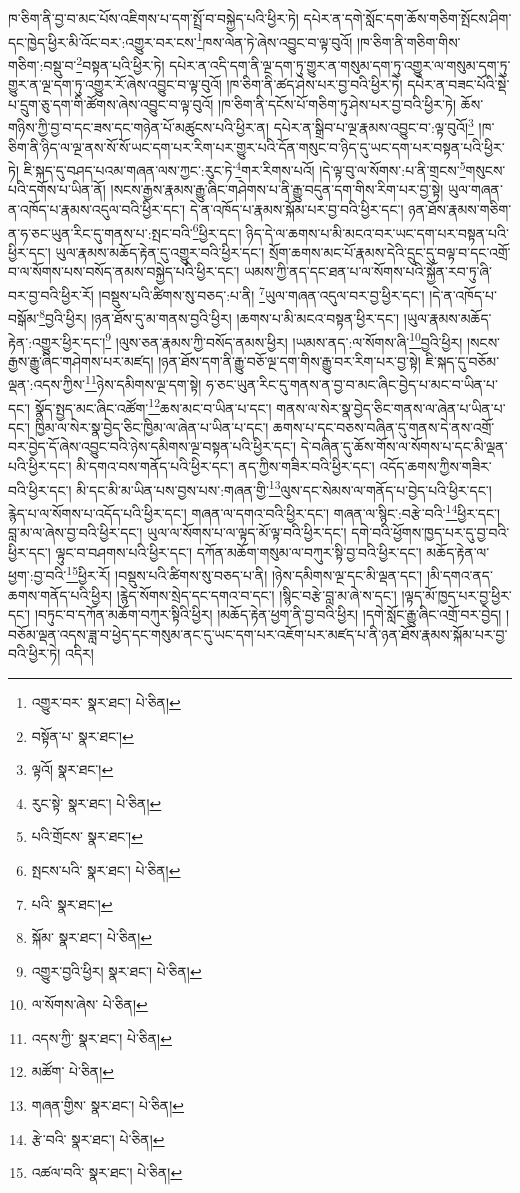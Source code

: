 ཁ་ཅིག་ནི་བྱ་བ་མང་པོས་འཇིགས་པ་དག་སྤྲོ་བ་བསྐྱེད་པའི་ཕྱིར་ཏེ། དཔེར་ན་དགེ་སློང་དག་ཆོས་གཅིག་སྤོངས་ཤིག་དང་ཁྱེད་ཕྱིར་མི་འོང་བར་:འགྱུར་བར་ངས་\footnote{འགྱུར་བར་  སྣར་ཐང་།  པེ་ཅིན། }ཁས་ལེན་ཏེ་ཞེས་འབྱུང་བ་ལྟ་བུའོ། །ཁ་ཅིག་ནི་གཅིག་གིས་གཅིག་:བསྡུ་བ་\footnote{བསྟོན་པ་  སྣར་ཐང་། }བསྟན་པའི་ཕྱིར་ཏེ། དཔེར་ན་འདི་དག་ནི་ལྔ་དག་ཏུ་གྱུར་ན་གསུམ་དག་ཏུ་འགྱུར་ལ་གསུམ་དག་ཏུ་གྱུར་ན་ལྔ་དག་ཏུ་འགྱུར་རོ་ཞེས་འབྱུང་བ་ལྟ་བུའོ། །ཁ་ཅིག་ནི་ཚད་ཤེས་པར་བྱ་བའི་ཕྱིར་ཏེ། དཔེར་ན་བཟང་པོའི་སྡེ་པ་དྲུག་ཅུ་དག་གི་ཚོགས་ཞེས་འབྱུང་བ་ལྟ་བུའོ། །ཁ་ཅིག་ནི་དངོས་པོ་གཅིག་ཏུ་ཤེས་པར་བྱ་བའི་ཕྱིར་ཏེ། ཆོས་གཉིས་ཀྱི་བྱ་བ་དང་ཟས་དང་གཉེན་པོ་མཚུངས་པའི་ཕྱིར་ན། དཔེར་ན་སྒྲིབ་པ་ལྔ་རྣམས་འབྱུང་བ་:ལྟ་བུའོ།\footnote{ལྟའོ།  སྣར་ཐང་། } །ཁ་ཅིག་ནི་ཉིད་ལ་ལྔ་ནས་སོ་སོ་ཡང་དག་པར་རིག་པར་གྱུར་པའི་དོན་གསུང་བ་ཉིད་དུ་ཡང་དག་པར་བསྟན་པའི་ཕྱིར་ཏེ། ཇི་སྐད་དུ་བཤད་པའམ་གཞན་ལས་ཀྱང་:རུང་ཏེ་\footnote{རུང་སྟེ་  སྣར་ཐང་།  པེ་ཅིན། }གར་རིགས་པའོ། །དེ་ལྟ་བུ་ལ་སོགས་:པ་ནི་གྲངས་\footnote{པའི་གྲོངས་  སྣར་ཐང་། }གསུངས་པའི་དགོས་པ་ཡིན་ནོ། །སངས་རྒྱས་རྣམས་རྒྱུ་ཞིང་གཤེགས་པ་ནི་རྒྱུ་བདུན་དག་གིས་རིག་པར་བྱ་སྟེ། ཡུལ་གཞན་ན་འཁོད་པ་རྣམས་འདུལ་བའི་ཕྱིར་དང་། དེ་ན་འཁོད་པ་རྣམས་སྐོམ་པར་བྱ་བའི་ཕྱིར་དང་། ཉན་ཐོས་རྣམས་གཅིག་ན་ཧ་ཅང་ཡུན་རིང་དུ་གནས་པ་:སྤང་བའི་\footnote{སྤངས་པའི་  སྣར་ཐང་།  པེ་ཅིན། }ཕྱིར་དང་། ཉིད་དེ་ལ་ཆགས་པ་མི་མངའ་བར་ཡང་དག་པར་བསྟན་པའི་ཕྱིར་དང་། ཡུལ་རྣམས་མཆོད་རྟེན་དུ་འགྱུར་བའི་ཕྱིར་དང་། སྲོག་ཆགས་མང་པོ་རྣམས་དེའི་དྲུང་དུ་བལྟ་བ་དང་འགྲོ་བ་ལ་སོགས་པས་བསོད་ནམས་བསྐྱེད་པའི་ཕྱིར་དང་། ཡམས་ཀྱི་ནད་དང་ཐན་པ་ལ་སོགས་པའི་སྐྱོན་རབ་ཏུ་ཞི་བར་བྱ་བའི་ཕྱིར་རོ། །བསྡུས་པའི་ཚིགས་སུ་བཅད་:པ་ནི། \footnote{པའི་  སྣར་ཐང་། }ཡུལ་གཞན་འདུལ་བར་བྱ་ཕྱིར་དང་། །དེ་ན་འཁོད་པ་བསྒོམ་\footnote{སྐོམ་  སྣར་ཐང་།  པེ་ཅིན། }བྱའི་ཕྱིར། །ཉན་ཐོས་དུ་མ་གནས་བྱའི་ཕྱིར། །ཆགས་པ་མི་མངའ་བསྟན་ཕྱིར་དང་། །ཡུལ་རྣམས་མཆོད་རྟེན་:འགྱུར་ཕྱིར་དང་།\footnote{འགྱུར་བྱའི་ཕྱིར།  སྣར་ཐང་།  པེ་ཅིན། } །ལུས་ཅན་རྣམས་ཀྱི་བསོད་ནམས་ཕྱིར། །ཡམས་ནད་:ལ་སོགས་ཞི་\footnote{ལ་སོགས་ཞེས་  པེ་ཅིན། }བྱའི་ཕྱིར། །སངས་རྒྱས་རྒྱུ་ཞིང་གཤེགས་པར་མཛད། །ཉན་ཐོས་དག་ནི་རྒྱུ་བཅོ་ལྔ་དག་གིས་རྒྱུ་བར་རིག་པར་བྱ་སྟེ། ཇི་སྐད་དུ་བཅོམ་ལྡན་:འདས་ཀྱིས་\footnote{འདས་ཀྱི་  སྣར་ཐང་།  པེ་ཅིན། }ཉེས་དམིགས་ལྔ་དག་སྟེ། ཧ་ཅང་ཡུན་རིང་དུ་གནས་ན་བྱ་བ་མང་ཞིང་བྱེད་པ་མང་བ་ཡིན་པ་དང་། སྣོད་སྤྱད་མང་ཞིང་འཚོག་\footnote{མཚོག་  པེ་ཅིན། }ཆས་མང་བ་ཡིན་པ་དང་། གནས་ལ་སེར་སྣ་བྱེད་ཅིང་གནས་ལ་ཞེན་པ་ཡིན་པ་དང་། ཁྱིམ་ལ་སེར་སྣ་བྱེད་ཅིང་ཁྱིམ་ལ་ཞེན་པ་ཡིན་པ་དང་། ཆགས་པ་དང་བཅས་བཞིན་དུ་གནས་དེ་ནས་འགྲོ་བར་བྱེད་དོ་ཞེས་འབྱུང་བའི་ཉེས་དམིགས་ལྔ་བསྟན་པའི་ཕྱིར་དང་། དེ་བཞིན་དུ་ཆོས་གོས་ལ་སོགས་པ་དང་མི་ལྡན་པའི་ཕྱིར་དང་། མི་དགའ་བས་གནོད་པའི་ཕྱིར་དང་། ནད་ཀྱིས་གཟིར་བའི་ཕྱིར་དང་། འདོད་ཆགས་ཀྱིས་གཟིར་བའི་ཕྱིར་དང་། མི་དང་མི་མ་ཡིན་པས་བྱས་པས་:གཞན་གྱི་\footnote{གཞན་གྱིས་  སྣར་ཐང་།  པེ་ཅིན། }ལུས་དང་སེམས་ལ་གནོད་པ་བྱེད་པའི་ཕྱིར་དང་། རྙེད་པ་ལ་སོགས་པ་འདོད་པའི་ཕྱིར་དང་། གཞན་ལ་དགའ་བའི་ཕྱིར་དང་། གཞན་ལ་སྙིང་:བརྩེ་བའི་\footnote{རྩེ་བའི་  སྣར་ཐང་།  པེ་ཅིན། }ཕྱིར་དང་། བླ་མ་ལ་ཞེས་བྱ་བའི་ཕྱིར་དང་། ཡུལ་ལ་སོགས་པ་ལ་ལྟད་མོ་ལྟ་བའི་ཕྱིར་དང་། དགེ་བའི་ཕྱོགས་ཁྱད་པར་དུ་བྱ་བའི་ཕྱིར་དང་། ལྟུང་བ་བཤགས་པའི་ཕྱིར་དང་། དཀོན་མཆོག་གསུམ་ལ་བཀུར་སྟི་བྱ་བའི་ཕྱིར་དང་། མཆོད་རྟེན་ལ་ཕྱག་:བྱ་བའི་\footnote{འཚལ་བའི་  སྣར་ཐང་།  པེ་ཅིན། }ཕྱིར་རོ། །བསྡུས་པའི་ཚིགས་སུ་བཅད་པ་ནི། །ཉེས་དམིགས་ལྔ་དང་མི་ལྡན་དང་། །མི་དགའ་ནད་ཆགས་གནོད་པའི་ཕྱིར། །རྙེད་སོགས་སྲེད་དང་དགའ་བ་དང་། །སྙིང་བརྩེ་བླ་མ་ཞེ་ས་དང་། །ལྟད་མོ་ཁྱད་པར་བྱ་ཕྱིར་དང་། །བཏུང་བ་དཀོན་མཆོག་བཀུར་སྟིའི་ཕྱིར། །མཆོད་རྟེན་ཕྱག་ནི་བྱ་བའི་ཕྱིར། །དགེ་སློང་རྒྱུ་ཞིང་འགྲོ་བར་བྱེད། །བཅོམ་ལྡན་འདས་ཟླ་བ་ཕྱེད་དང་གསུམ་ནང་དུ་ཡང་དག་པར་འཇོག་པར་མཛད་པ་ནི་ཉན་ཐོས་རྣམས་སྐོམ་པར་བྱ་བའི་ཕྱིར་ཏེ། འདིར། 